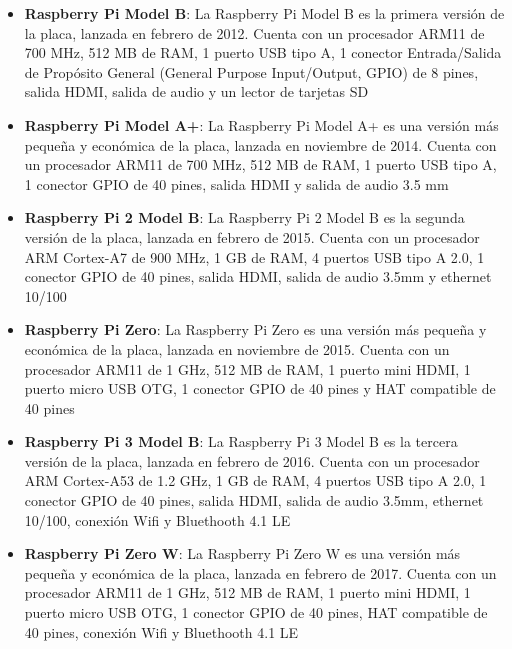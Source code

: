     \begin{itemize}
        \item \textbf{Raspberry Pi Model B}: La Raspberry Pi Model B es la primera versi\'on de la placa, 
            lanzada en febrero de 2012. Cuenta con un procesador ARM11 de 700 MHz, 512 MB de RAM, 
            1 puerto USB tipo A, 1 conector Entrada/Salida de Prop\'osito General (General Purpose Input/Output, GPIO) de 8 pines, salida HDMI, salida de audio y un lector de tarjetas SD \cite{Santamaria2023}
        \item \textbf{Raspberry Pi Model A+}: La Raspberry Pi Model A+ es una versi\'on m\'as peque\~na y 
            econ\'omica de la placa, lanzada en noviembre de 2014. Cuenta con un procesador ARM11 de 700 MHz, 
            512 MB de RAM, 1 puerto USB tipo A, 1 conector GPIO de 40 pines, salida HDMI y salida de audio 3.5 mm \cite{Santamaria2023}
        \item \textbf{Raspberry Pi 2 Model B}: La Raspberry Pi 2 Model B es la segunda versi\'on de la placa, 
            lanzada en febrero de 2015. Cuenta con un procesador ARM Cortex-A7 de 900 MHz, 1 GB de RAM, 
            4 puertos USB tipo A 2.0, 1 conector GPIO de 40 pines, salida HDMI, salida de audio 3.5mm y ethernet 10/100 \cite{Santamaria2023}
        \item \textbf{Raspberry Pi Zero}: La Raspberry Pi Zero es una versi\'on m\'as peque\~na y econ\'omica 
            de la placa, lanzada en noviembre de 2015. Cuenta con un procesador ARM11 de 1 GHz, 512 MB de RAM, 
            1 puerto mini HDMI, 1 puerto micro USB OTG, 1 conector GPIO de 40 pines y HAT compatible de 40 pines \cite{Santamaria2023} 
        \item \textbf{Raspberry Pi 3 Model B}: La Raspberry Pi 3 Model B es la tercera versi\'on de la placa, 
            lanzada en febrero de 2016. Cuenta con un procesador ARM Cortex-A53 de 1.2 GHz, 1 GB de RAM, 
            4 puertos USB tipo A 2.0, 1 conector GPIO de 40 pines, salida HDMI, salida de audio 3.5mm, ethernet 10/100, 
            conexi\'on Wifi y Bluethooth 4.1 LE \cite{Santamaria2023}
        \item \textbf{Raspberry Pi Zero W}: La Raspberry Pi Zero W es una versi\'on m\'as peque\~na y econ\'omica 
            de la placa, lanzada en febrero de 2017. Cuenta con un procesador ARM11 de 1 GHz, 512 MB de RAM, 
            1 puerto mini HDMI, 1 puerto micro USB OTG, 1 conector GPIO de 40 pines, HAT compatible de 40 pines, 
            conexi\'on Wifi y Bluethooth 4.1 LE \cite{Santamaria2023}

\end{itemize}
